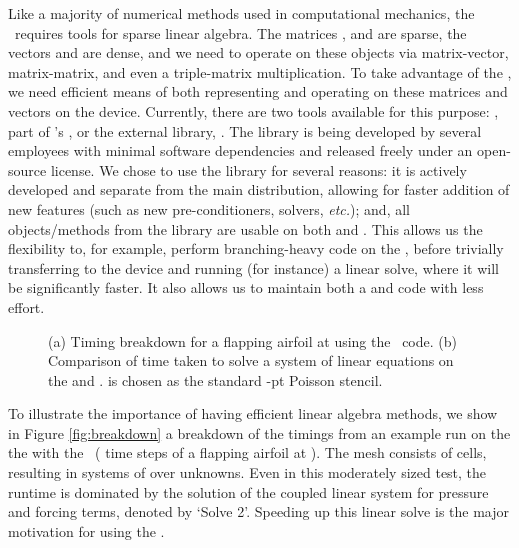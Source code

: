 

Like a majority of numerical methods used in computational mechanics, the \ibm\ requires tools for sparse linear algebra. The matrices ,  and  are sparse, the vectors  and  are dense, and we need to operate on these objects via matrix-vector, matrix-matrix, and even a triple-matrix multiplication. To take advantage of the {\gpu}, we need efficient means of both representing and operating on these matrices and vectors on the device. Currently, there are two tools available for this purpose: {\cusparse}, part of {\NV}'s {\cuda}, or the external library, {\cusp}. The {\cusp} library is being developed by several {\NV} employees with minimal software dependencies and released freely under an open-source license. We chose to use the {\cusp} library for several reasons: it is actively developed and separate from the main {\cuda} distribution, allowing for faster addition of new features (such as new pre-conditioners, solvers, \emph{etc.}); and, all objects/methods from the library are usable on both {\cpu} and {\gpu}. This allows us the flexibility to, for example, perform branching-heavy code on the {\cpu}, before trivially transferring to the device and running (for instance) a linear solve, where it will be significantly faster. It also allows us to maintain both a {\cpu} and {\gpu} code with less effort.

\begin{figure*}\centering
		\caption{\small (a)  Timing breakdown for a flapping airfoil at  using the \gpu\ code. (b) Comparison of time taken to solve a system of linear equations  on the {\cpu} and {\gpu}.  is chosen as the standard -pt Poisson stencil.}
\end{figure*}

To illustrate the importance of having efficient linear algebra methods, we show in Figure \ref{fig:breakdown} a breakdown of the timings from an example run on the {\gpu} the with the \ibm\ ( time steps of a flapping airfoil at ). The mesh consists of  cells, resulting in systems of over  unknowns. Even in this moderately sized test, the runtime is dominated by the solution of the coupled linear system for pressure and forcing terms, denoted by `Solve 2'.
Speeding up this linear solve is the major motivation for using the {\gpu}.

